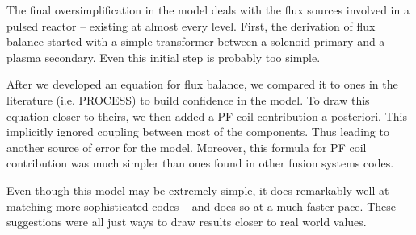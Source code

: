 The final oversimplification in the model deals with the flux sources involved in a pulsed reactor -- existing at almost every level. First, the derivation of flux balance started with a simple transformer between a solenoid primary and a plasma secondary. Even this initial step is probably too simple.

After we developed an equation for flux balance, we compared it to ones in the literature (i.e. PROCESS) to build confidence in the model. To draw this equation closer to theirs, we then added a PF coil contribution a posteriori. This implicitly ignored coupling between most of the components. Thus leading to another source of error for the model. Moreover, this formula for PF coil contribution was much simpler than ones found in other fusion systems codes.

Even though this model may be extremely simple, it does remarkably well at matching more sophisticated codes -- and does so at a much faster pace. These suggestions were all just ways to draw results closer to real world values.

%
